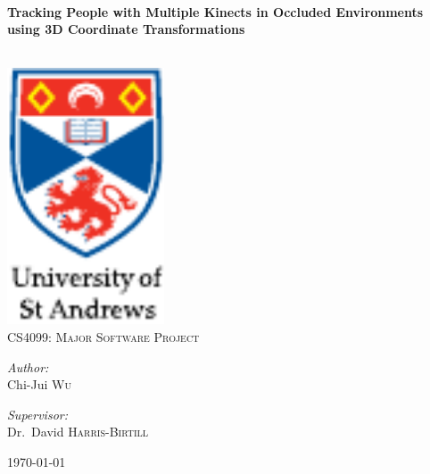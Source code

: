 
\begin{titlepage}

\begin{center}

\HRule \\[0.4cm]
{\huge \bfseries Tracking People with Multiple Kinects in Occluded Environments using 3D Coordinate Transformations
\\[0.4cm] }

\HRule \\[3cm]


\includegraphics[width=0.35\textwidth]{figs/st-andrews-logo}~\\[1cm]

\textsc{\Large CS4099: Major Software Project}\\[1cm]

\noindent

\begin{minipage}{0.3\textwidth}

\begin{center} \large

\emph{Author:}\\

Chi-Jui \textsc{Wu}

\end{center}

\end{minipage}%
\begin{minipage}{0.3\textwidth}

\begin{center} \large

\emph{Supervisor:} \\

Dr.~David \textsc{Harris-Birtill}

\end{center}

\end{minipage}%

\vfill

{\large \today}

\end{center}

\end{titlepage}
